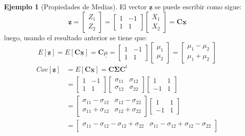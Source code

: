 \documentclass[
]{book}
\theoremstyle{definition}
\theoremstyle{definition}
\newtheorem{example}{Ejemplo}[chapter]
\theoremstyle{definition}
\theoremstyle{definition}
\theoremstyle{remark}
\begin{document}
\begin{example}[Propiedades de Medias]
El vector \(\underline{\mathbf{z}}\) se puede escribir como sigue:
\[
\underline{\mathbf{z}}=\begin{bmatrix}
Z_1 \\ Z_2
\end{bmatrix}=\begin{bmatrix}
1 & -1 \\
1 & 1
\end{bmatrix}\begin{bmatrix}
X_1 \\ X_2
\end{bmatrix} =\mathbf{C}\underline{\mathbf{x}}
\]
luego, usando el resultado anterior se tiene que:
\[
E[\underline{\mathbf{z}}]=E[\mathbf{C}\underline{\mathbf{x}}]
=\mathbf{C}\underline{\mu}=\begin{bmatrix}
1 & -1 \\
1 & 1
\end{bmatrix}\begin{bmatrix}
\mu_1 \\ \mu_2
\end{bmatrix}=\begin{bmatrix}
\mu_1-\mu_2 \\
\mu_1+\mu_2
\end{bmatrix}
\]
\begin{align*}
Cov[\underline{\mathbf{z}}]&=E[\mathbf{C}\underline{\mathbf{x}}]
=\mathbf{C} \mathbf{\Sigma} \mathbf{C}^t\\
&=\begin{bmatrix}
1 & -1 \\
1 & 1
\end{bmatrix}\begin{bmatrix}
\sigma_{11} & \sigma_{12}\\
\sigma_{12} & \sigma_{22}
\end{bmatrix}\begin{bmatrix}
1 & 1 \\
-1 & 1
\end{bmatrix}\\
&=
\begin{bmatrix}
\sigma_{11}-\sigma_{12} & \sigma_{12}-\sigma_{22}\\
\sigma_{11}+\sigma_{12} & \sigma_{12}+ \sigma_{22}
\end{bmatrix}\begin{bmatrix}
1 & 1 \\
-1 & 1
\end{bmatrix}\\
&=
\begin{bmatrix}
\sigma_{11}-\sigma_{12}-\sigma_{12}+\sigma_{22} & \sigma_{11}-\sigma_{12}+\sigma_{12}-\sigma_{22}\\

\end{bmatrix}
\end{align*}
\end{example}
\end{document}
